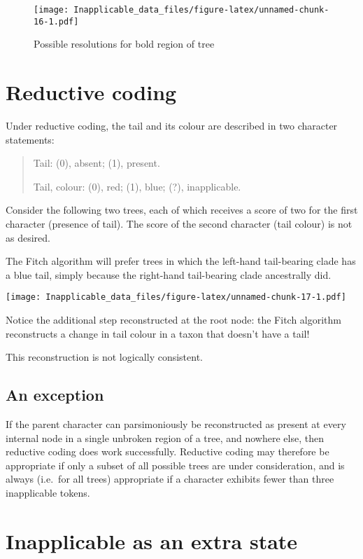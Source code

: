 \documentclass[]{book}
\theoremstyle{definition}
\theoremstyle{definition}
\theoremstyle{definition}
\theoremstyle{remark}
\begin{document}
\begin{figure}
\centering
\texttt{[image: Inapplicable\_data\_files/figure-latex/unnamed-chunk-16-1.pdf]}
\caption{\label{fig:unnamed-chunk-16}Possible resolutions for bold region of
tree}
\end{figure}

\hypertarget{reductive-coding}{%
\section{Reductive coding}\label{reductive-coding}}

Under reductive coding, the tail and its colour are described in two
character statements:

\begin{quote}
Tail: (0), absent; (1), present.

Tail, colour: (0), red; (1), blue; (?), inapplicable.
\end{quote}

Consider the following two trees, each of which receives a score of two
for the first character (presence of tail). The score of the second
character (tail colour) is not as desired.

The Fitch algorithm will prefer trees in which the left-hand
tail-bearing clade has a blue tail, simply because the right-hand
tail-bearing clade ancestrally did.

\texttt{[image: Inapplicable\_data\_files/figure-latex/unnamed-chunk-17-1.pdf]}

Notice the additional step reconstructed at the root node: the Fitch
algorithm reconstructs a change in tail colour in a taxon that doesn't
have a tail!

This reconstruction is not logically consistent.

\hypertarget{an-exception}{%
\subsection{An exception}\label{an-exception}}

If the parent character can parsimoniously be reconstructed as present
at every internal node in a single unbroken region of a tree, and
nowhere else, then reductive coding does work successfully. Reductive
coding may therefore be appropriate if only a subset of all possible
trees are under consideration, and is always (i.e.~for all trees)
appropriate if a character exhibits fewer than three inapplicable
tokens.

\hypertarget{inapplicable-as-an-extra-state}{%
\section{Inapplicable as an extra
state}\label{inapplicable-as-an-extra-state}}
\end{document}
